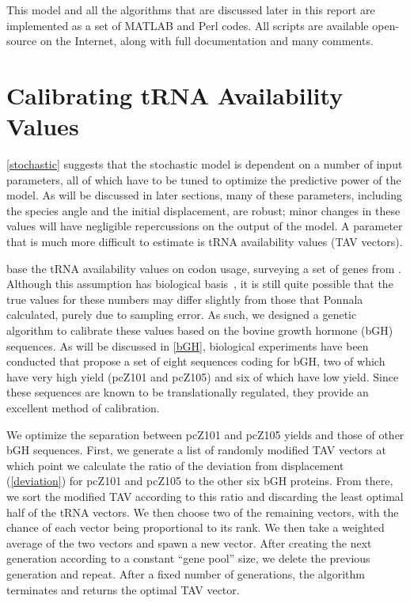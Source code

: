 \documentclass[12pt, draft]{article}
\numberwithin{equation}{section}
\begin{document}
This model and all the algorithms that are discussed later in this report
are implemented as a set of MATLAB and Perl codes.  All scripts are available
open-source on the Internet, along with full documentation and many comments.

\section{Calibrating tRNA Availability Values}

\autoref{stochastic} suggests that the stochastic model is dependent
on a number of input parameters, all of which have to be tuned to optimize
the predictive power of the model.  As will be discussed in later sections,
many of these parameters, including the species angle and the initial displacement,
are robust; minor changes in these values will have negligible repercussions
on the output of the model.  A parameter that is much more difficult to estimate
is tRNA availability values (TAV vectors).

\citeauthor{lalit:embs} base the tRNA availability values on codon usage, 
surveying a set of genes from \ecoli.
Although this assumption has biological basis~\cite{ikemura}, 
it is still quite possible that the true values for these numbers may differ 
slightly from those that Ponnala calculated, purely due to sampling error.  
As such, we designed a genetic algorithm to calibrate these values based on the bovine growth hormone (bGH) sequences.
As will be discussed in \autoref{bGH}, biological experiments
have been conducted \cite{schoner:bgh} that propose a set of eight sequences coding for bGH,
two of which have very high yield (pcZ101 and pcZ105) and six of which have low yield.
Since these sequences are known to be translationally regulated, they
provide an excellent method of calibration.

We optimize the separation between pcZ101 and pcZ105 yields and those of other bGH sequences.  
First, we generate a list of randomly modified TAV vectors at which
point we calculate the ratio of the deviation from
displacement (\autoref{deviation}) for pcZ101 and pcZ105 to the other
six bGH proteins. From there, we sort the modified TAV according to
this ratio and discarding the least optimal half of the tRNA
vectors. We then choose two of the remaining vectors, with the chance
of each vector being proportional to its rank.  We then take a
weighted average of the two vectors and spawn a new vector.  After
creating the next generation according to a constant ``gene pool''
size, we delete the previous generation and repeat. After a fixed
number of generations, the algorithm terminates and returns the
optimal TAV vector.
\end{document}
